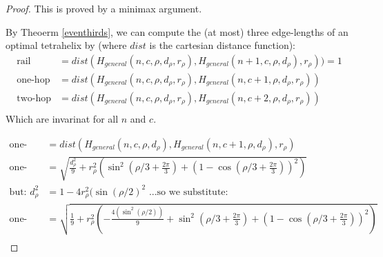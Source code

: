 \documentclass[11pt]{article}
\begin{document}
\begin{proof}
This is proved by a minimax argument.

By Theoerm \ref{eventhirds}, we can compute the (at most) three edge-lengths of an optimal
tetrahelix by (where $dist$ is the cartesian distance function):
\begin{align*}
  \text{rail} &= dist(H_{general}(n,c,\rho,d_{\rho},r_{\rho}),H_{general}(n+1,c,\rho,d_{\rho}),r_{\rho})) = 1 \\
  \text{one-hop} &= dist(H_{general}(n,c,\rho,d_{\rho},r_{\rho}),H_{general}(n,c+1,\rho,d_{\rho},r_{\rho}))  \\
  \text{two-hop} &= dist(H_{general}(n,c,\rho,d_{\rho},r_{\rho}),H_{general}(n,c+2,\rho,d_{\rho},r_{\rho}))  \\  
\end{align*}
Which are invarinat for all $n$ and $c$.

\begin{align*}
  \text{one-hop} &= dist(H_{general}(n,c,\rho,d_{\rho}),H_{general}(n,c+1,\rho,d_{\rho}),r_{\rho})  \\
  \text{one-hop}  &= \sqrt{\frac{d_{\rho}^2}{9} + r_{\rho}^2(\sin^2(\rho/3 + \frac{2\pi}{3})  + (1 - \cos(\rho/3 + \frac{2\pi}{3}))^2)} \\
  \text{but: }  d_{\rho}^2 &= 1 - 4 r_{\rho}^2 (\sin( \rho / 2)^2 \text{ ...so we substitute:}\\
  \text{one-hop}  &= \sqrt{\frac{1}{9}  + r_{\rho}^2(-\frac{4 (\sin^2( \rho / 2))}{9} + \sin^2(\rho/3+ \frac{2\pi}{3})  + (1 - \cos(\rho/3 + \frac{2\pi}{3}))^2)} \\
\end{align*}


\end{proof}
\end{document}
